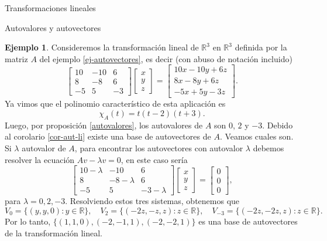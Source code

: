 \documentclass[a4paper,12pt,twoside,spanish,reqno]{amsbook}
\theoremstyle{definition}
\newtheorem{ejemplo}{Ejemplo}[section]
\theoremstyle{remark}
\newcommand{\R}{\mathbb R}
\begin{document}
\begin{chapter}{Transformaciones lineales}
\begin{section}{Autovalores y autovectores}
        \begin{ejemplo} Consideremos la transformación lineal de $\R^3$ en $\R^3$  definida por la matriz $A$ del ejemplo \ref{ej-autovectores},  es decir (con abuso de notación incluido)
            \begin{equation*}
                \begin{bmatrix}10&-10&6\\8& -8& 6\\-5& 5& -3\end{bmatrix}
                \begin{bmatrix} x\\y\\z \end{bmatrix} =
                \begin{bmatrix} 10x-10y+6z\\8x -8y +6z \\-5x+5y-3z\end{bmatrix}.
            \end{equation*}
        Ya vimos que  el  polinomio característico de esta aplicación es 
        $$
        \chi_A(t) = t (t-2)(t+3).
        $$
        Luego, por 	proposición \ref{autovalores}, los autovalores de $A$ son $0$, $2$ y $-3$. Debido al corolario \ref{cor-aut-li} existe una base de autovectores de $A$. Veamos cuales son. Si $\lambda$ autovalor de $A$, para encontrar los autovectores con autovalor $\lambda$  debemos resolver la ecuación $Av -\lambda v=0 $,  en este caso sería
        \begin{equation*}
        \begin{bmatrix}10- \lambda &-10&6\\8& -8- \lambda & 6\\-5& 5& -3- \lambda \end{bmatrix}
        \begin{bmatrix} x\\y\\z \end{bmatrix} =
        \begin{bmatrix} 0\\0 \\0\end{bmatrix},
        \end{equation*}  
        para $\lambda =0, 2,-3$. Resolviendo estos tres sistemas, obtenemos que 
        \begin{equation*}
            V_0 = \{(y,y,0): y \in \R \},\quad V_2 = \{(-2z,-z,z): z \in \R \},\quad V_{-3} = \{(-2z,-2z,z): z \in \R \}. 
        \end{equation*}
        Por lo tanto, $\{(1,1,0), (-2,-1,1), (-2,-2,1)\}$ es una base de autovectores de la transformación lineal. 
        \end{ejemplo}
        

\end{section}
\end{chapter}
\end{document}
